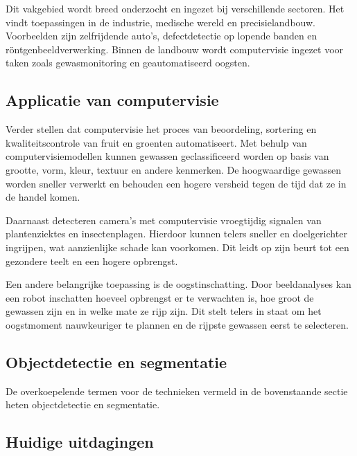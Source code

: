 Dit vakgebied wordt breed onderzocht en ingezet bij verschillende sectoren. Het vindt toepassingen in de industrie, medische wereld en precisielandbouw. Voorbeelden zijn zelfrijdende auto’s, defectdetectie op lopende banden en röntgenbeeldverwerking. Binnen de landbouw wordt computervisie ingezet voor taken zoals gewasmonitoring en geautomatiseerd oogsten.

\subsection{Applicatie van computervisie}
Verder stellen \textcite{Radojcic2023} dat computervisie het proces van beoordeling, sortering en kwaliteitscontrole van fruit en groenten automatiseert. Met behulp van computervisiemodellen kunnen gewassen geclassificeerd worden op basis van grootte, vorm, kleur, textuur en andere kenmerken. De hoogwaardige gewassen worden sneller verwerkt en behouden een hogere versheid tegen de tijd dat ze in de handel komen.

Daarnaast detecteren camera’s met computervisie vroegtijdig signalen van plantenziektes en insectenplagen. Hierdoor kunnen telers sneller en doelgerichter ingrijpen, wat aanzienlijke schade kan voorkomen. Dit leidt op zijn beurt tot een gezondere teelt en een hogere opbrengst.

Een andere belangrijke toepassing is de oogstinschatting. Door beeldanalyses kan een robot inschatten hoeveel opbrengst er te verwachten is, hoe groot de gewassen zijn en in welke mate ze rijp zijn. Dit stelt telers in staat om het oogstmoment nauwkeuriger te plannen en de rijpste gewassen eerst te selecteren.

\subsection{Objectdetectie en segmentatie}
De overkoepelende termen voor de technieken vermeld in de bovenstaande sectie heten objectdetectie en segmentatie.

\subsection{Huidige uitdagingen}







